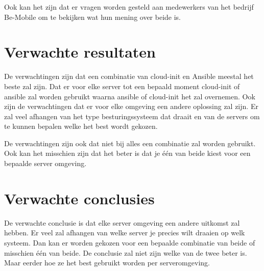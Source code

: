 Ook kan het zijn dat er vragen worden gesteld aan medewerkers van het bedrijf Be-Mobile om te bekijken wat hun mening over beide is.


\section{Verwachte resultaten}
\label{sec:verwachte_resultaten}
De verwachtingen zijn dat een combinatie van cloud-init en Ansible meestal het beste zal zijn. Dat er voor elke server tot een bepaald moment cloud-init of ansible  zal worden gebruikt waarna ansible of cloud-init het zal overnemen. Ook zijn de verwachtingen dat er voor elke omgeving een andere oplossing zal zijn. Er zal veel afhangen van het type besturingssysteem dat draait en van de servers om te kunnen bepalen welke het best wordt gekozen. 

De verwachtingen zijn ook dat niet bij alles een combinatie zal worden gebruikt. Ook kan het misschien zijn dat het beter is dat je één van beide kiest voor een bepaalde server omgeving.



\section{Verwachte conclusies}
\label{sec:verwachte_conclusies}
De verwachte conclusie is dat elke server omgeving een andere uitkomst zal hebben. Er veel zal afhangen van welke server je precies wilt draaien op welk systeem. Dan kan er worden gekozen voor een bepaalde combinatie van beide of misschien één van beide. De conclusie zal niet zijn welke van de twee beter is. Maar eerder hoe ze het best gebruikt worden per serveromgeving.




